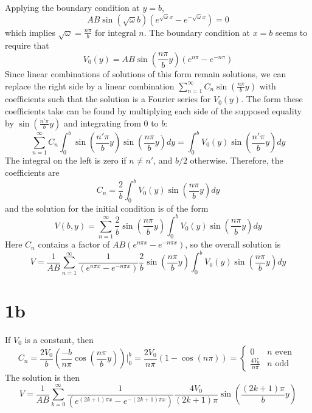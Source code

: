 \documentclass{article}
\begin{document}
Applying the boundary condition at $y=b$,
\[AB\sin(\sqrt{\omega}b)\left( e^{\sqrt{\omega}x}-e^{-\sqrt{\omega}x} \right)=0\]
which implies $\sqrt{\omega}=\frac{n\pi}{b}$ for integral $n$.
The boundary condition at $x=b$ seems to require that
\[V_0(y)=AB\sin\left(\frac{n\pi}{b}y\right)\left( e^{n\pi}-e^{-n\pi} \right)\]
Since linear combinations of solutions of this form remain solutions, we can replace the right side by a linear combination
$\sum_{n=1}^\infty C_n\sin\left( \frac{n\pi}{b}y \right)$ with coefficients such that the solution is a Fourier series for $V_0(y)$. The form these coefficients take can be found by multiplying each side of the supposed equality by $\sin\left( \frac{n'\pi}{b}y \right)$ and integrating from $0$ to $b$:
\[\sum_{n=1}^\infty C_n\int_0^b\sin\left(\frac{n'\pi}{b}y\right)\sin\left( \frac{n\pi}{b}y \right)dy=\int_0^bV_0(y)\sin\left(\frac{n'\pi}{b}y\right)dy\]
The integral on the left is zero if $n\neq n'$, and $b/2$ otherwise.
Therefore, the coefficients are
\[C_n=\frac{2}{b}\int_0^bV_0(y)\sin\left(\frac{n\pi}{b}y\right)dy\]
and the solution for the initial condition is of the form
\[V(b,y)=\sum_{n=1}^\infty\frac{2}{b}\sin\left( \frac{n\pi}{b}y \right)\int_0^bV_0(y)\sin\left( \frac{n\pi}{b}{y} \right)dy\]
Here $C_n$ contains a factor of $AB(e^{n\pi x}-e^{-n\pi x})$, so the overall solution is
\[V=\frac{1}{AB}\sum_{n=1}^\infty\frac{1}{\left( e^{n\pi x}-e^{-n\pi x} \right)}\frac{2}{b}\sin\left( \frac{n\pi}{b}y \right)\int_0^bV_0(y)\sin\left(\frac{n\pi}{b}y \right)dy\]

\section*{1b}
If $V_0$ is a constant, then \[C_n=\frac{2V_0}{b}\left( \frac{-b}{n\pi}\cos\left( \frac{n\pi}{b}y \right) \right)\bigg|_0^b=\frac{2V_0}{n\pi}\left(1-\cos({n\pi}) \right)=\begin{cases}
    0 & n \textrm{ even } \\
    \frac{4V_0}{n\pi} & n \textrm{ odd }
  \end{cases}\]
The solution is then
\[V=\frac{1}{AB}\sum_{k=0}^\infty\frac{1}{\left( e^{(2k+1)\pi x}-e^{-(2k+1)\pi x} \right)}\frac{4V_0}{(2k+1)\pi}\sin\left( \frac{(2k+1)\pi}{b}y \right)\]
\end{document}
